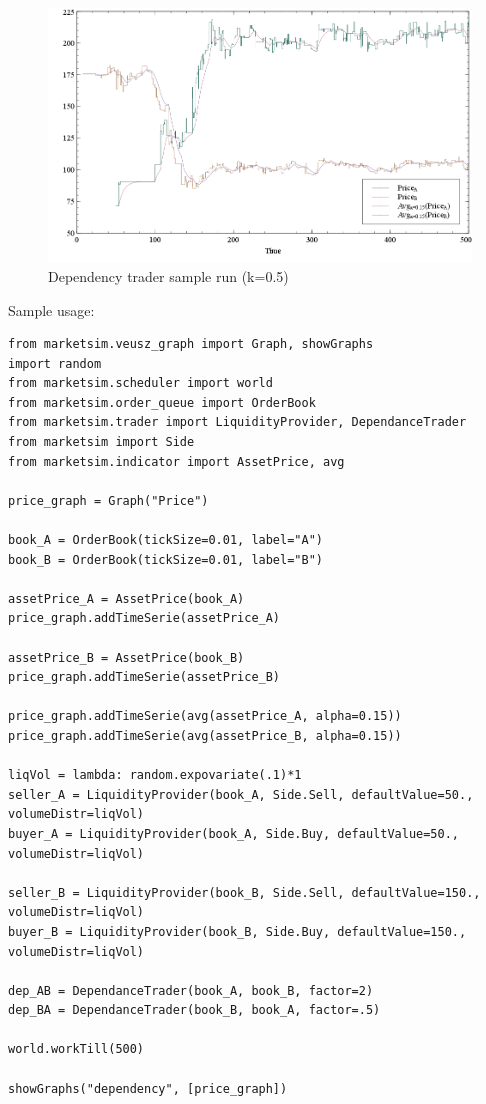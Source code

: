 \documentclass[a4paper,11pt]{article}
\begin{document}
\begin{figure}[htbp]
\centering
\includegraphics[width=1\linewidth]{Figures/Dependency.PNG}
\caption{Dependency trader sample run (k=0.5)}
\label{fig:Dependency}
\end{figure}

Sample usage:

\begin{verbatim}
from marketsim.veusz_graph import Graph, showGraphs
import random
from marketsim.scheduler import world
from marketsim.order_queue import OrderBook
from marketsim.trader import LiquidityProvider, DependanceTrader
from marketsim import Side
from marketsim.indicator import AssetPrice, avg

price_graph = Graph("Price")

book_A = OrderBook(tickSize=0.01, label="A")
book_B = OrderBook(tickSize=0.01, label="B")
 
assetPrice_A = AssetPrice(book_A)
price_graph.addTimeSerie(assetPrice_A)

assetPrice_B = AssetPrice(book_B)
price_graph.addTimeSerie(assetPrice_B)

price_graph.addTimeSerie(avg(assetPrice_A, alpha=0.15))
price_graph.addTimeSerie(avg(assetPrice_B, alpha=0.15))

liqVol = lambda: random.expovariate(.1)*1
seller_A = LiquidityProvider(book_A, Side.Sell, defaultValue=50., volumeDistr=liqVol)
buyer_A = LiquidityProvider(book_A, Side.Buy, defaultValue=50., volumeDistr=liqVol)

seller_B = LiquidityProvider(book_B, Side.Sell, defaultValue=150., volumeDistr=liqVol)
buyer_B = LiquidityProvider(book_B, Side.Buy, defaultValue=150., volumeDistr=liqVol)

dep_AB = DependanceTrader(book_A, book_B, factor=2)
dep_BA = DependanceTrader(book_B, book_A, factor=.5)

world.workTill(500)

showGraphs("dependency", [price_graph])
\end{verbatim}
\end{document}
